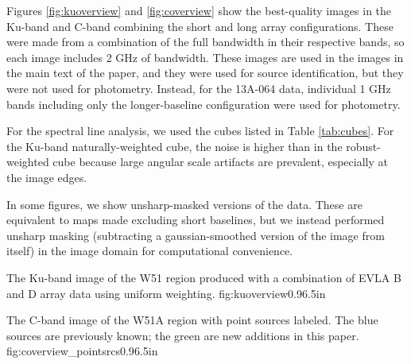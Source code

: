 Figures \ref{fig:kuoverview} and \ref{fig:coverview} show the best-quality
images in the Ku-band and C-band combining the short and long array
configurations.  These were made from a combination of the full bandwidth in
their respective bands, so each image includes 2 GHz of bandwidth.  These
images are used in the images in the main text of the paper, and they were used
for source identification, but they were not used for photometry.  Instead, for
the 13A-064 data, individual 1 GHz bands including only the longer-baseline
configuration were used for photometry.

For the spectral line analysis, we used the cubes listed in Table
\ref{tab:cubes}.  For the Ku-band naturally-weighted cube, the noise is higher
than in the robust-weighted cube because large angular scale artifacts are
prevalent, especially at the image edges.

In some figures, we show unsharp-masked versions of the data.  These are
equivalent to maps made excluding short baselines, but we instead performed
unsharp masking (subtracting a gaussian-smoothed version of the image from
itself) in the image domain for computational convenience.



{The Ku-band image of the W51 region produced with a combination of
EVLA B and D array data using uniform weighting.}
{fig:kuoverview}{0.9}{6.5in}

{The C-band image of the W51A region with point sources labeled.  The blue
sources are previously known; the green are new additions in this paper.}
{fig:coverview_pointsrcs}{0.9}{6.5in}

